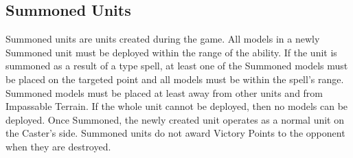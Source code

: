 \subsection{Summoned Units}
\label{summoned_units}

Summoned units are units created during the game. All models in a newly Summoned unit must be deployed within the range of the ability. If the unit is summoned as a result of a \ground{} type spell, at least one of the Summoned models must be placed on the targeted point and all models must be within the spell's range. Summoned models must be placed at least  away from other units and from Impassable Terrain. If the whole unit cannot be deployed, then no models can be deployed. Once Summoned, the newly created unit operates as a normal unit on the Caster's side. Summoned units do not award Victory Points to the opponent when they are destroyed.
